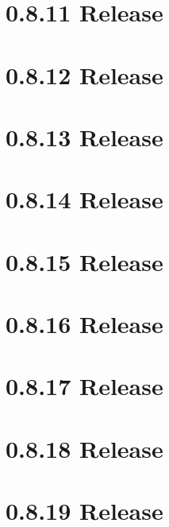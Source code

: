 \let\mypdfximage\pdfximage\def\pdfximage{\immediate\mypdfximage}\documentclass[twoside]{book}
\newcommand{\+}{\discretionary{\mbox{\scriptsize$\hookleftarrow$}}{}{}}
\begin{document}
\chapter{0.8.11 Release}
\label{doc_news_2015-04-03_0_8_11_md}

\chapter{0.8.12 Release}
\label{doc_news_2015-07-13_0_8_12_md}

\chapter{0.8.13 Release}
\label{doc_news_2015-09-17_0_8_13_md}

\chapter{0.8.14 Release}
\label{doc_news_2015-11-19_0_8_14_md}

\chapter{0.8.15 Release}
\label{doc_news_2016-02-16_0_8_15_md}

\chapter{0.8.16 Release}
\label{doc_news_2016-04-29_0_8_16_md}

\chapter{0.8.17 Release}
\label{doc_news_2016-06-14_0_8_17_md}

\chapter{0.8.18 Release}
\label{doc_news_2016-09-17_0_8_18_md}

\chapter{0.8.19 Release}
\label{doc_news_2016-11-22_0_8_19_md}

\end{document}
